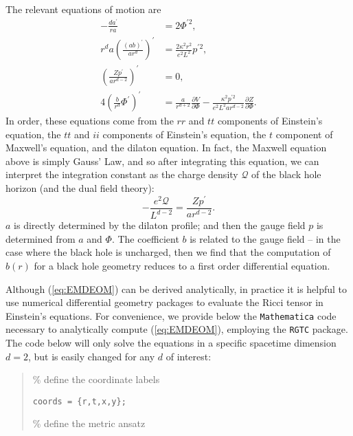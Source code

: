 \documentclass[10pt, oneside]{book}
\begin{document}
\begin{doublespace}
The relevant equations of motion are \begin{subequations}\label{eq:EMDEOM}\begin{align}
-\frac{da^\prime}{ra} &= 2\Phi^{\prime 2}, \label{eq:EMDEOM1} \\
r^da\left(\frac{(ab)^\prime}{ar^d}\right)^\prime &= \frac{2\kappa^2r^2}{e^2L^2} p^{\prime2}, \label{eq:EMDEOM2} \\
\left(\frac{Zp^\prime}{ar^{d-2}}\right)^\prime &= 0, \\
4\left(\frac{b}{r^d}\Phi^\prime\right)^\prime &= \frac{a}{r^{d+2}}\frac{\partial V}{\partial \Phi} - \frac{\kappa^2 p^{\prime 2}}{e^2L^2ar^{d-2}} \frac{\partial Z}{\partial \Phi}.
\end{align}\end{subequations}
In order, these equations come from the $rr$ and $tt$ components of Einstein's equation,  the $tt$ and $ii$ components of Einstein's equation,   the $t$ component of Maxwell's equation, and the dilaton equation.   In fact, the Maxwell equation above is simply Gauss' Law, and so after integrating this equation, we can interpret the integration constant as the charge density $\mathcal{Q}$ of the black hole horizon (and the dual field theory): \begin{equation}
-\frac{e^2\mathcal{Q}}{L^{d-2}} = \frac{Zp^\prime}{ar^{d-2}}.  \label{eq:gausslaw}
\end{equation}
$a$ is directly determined by the dilaton profile;  and then the gauge field $p$ is determined from $a$ and $\Phi$.   The coefficient $b$ is related to the gauge field -- in the case where the black hole is uncharged, then we find that the computation of $b(r)$ for a black hole geometry reduces to a first order differential equation.     

Although (\ref{eq:EMDEOM}) can be derived analytically, in practice it is helpful to use numerical differential geometry packages to evaluate the Ricci tensor in Einstein's equations.   For convenience, we provide below the \texttt{Mathematica} code necessary to analytically compute (\ref{eq:EMDEOM}),  employing the \texttt{RGTC} package.   The code below will only solve the equations in a specific spacetime dimension $d=2$, but is easily changed for any $d$ of interest:

\begin{quote} 

\% define the coordinate labels 

\texttt{coords = \{r,t,x,y\};}   

 \% define the metric ansatz 


\end{quote}
\end{doublespace}
\end{document}
